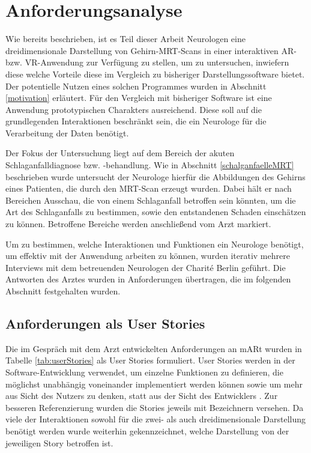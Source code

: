 
\chapter{Anforderungsanalyse}
\label{anforderung}

Wie bereits beschrieben, ist es Teil dieser Arbeit Neurologen eine dreidimensionale Darstellung von Gehirn-MRT-Scans in einer interaktiven AR- bzw. VR-Anwendung zur Verfügung zu stellen, um zu untersuchen, inwiefern diese welche Vorteile diese im Vergleich zu bisheriger Darstellungssoftware bietet.
Der potentielle Nutzen eines solchen Programmes wurden in Abschnitt \ref{motivation} erläutert.
Für den Vergleich mit bisheriger Software ist eine Anwendung prototypischen Charakters ausreichend. Diese soll auf die grundlegenden Interaktionen beschränkt sein, die ein Neurologe für die Verarbeitung der Daten benötigt.

Der Fokus der Untersuchung liegt auf dem Bereich der akuten Schlaganfalldiagnose bzw. -behandlung. Wie in Abschnitt \ref{schalganfaelleMRT} beschrieben wurde untersucht der Neurologe hierfür die Abbildungen des Gehirns eines Patienten, die durch den MRT-Scan erzeugt wurden. Dabei hält er nach Bereichen Ausschau, die von einem Schlaganfall betroffen sein könnten, um die Art des Schlaganfalls zu bestimmen, sowie den entstandenen Schaden einschätzen zu können. Betroffene Bereiche werden anschließend vom Arzt markiert. 

Um zu bestimmen, welche Interaktionen und Funktionen ein Neurologe benötigt, um effektiv mit der Anwendung arbeiten zu können, wurden iterativ mehrere Interviews mit dem betreuenden Neurologen der Charité Berlin geführt. Die Antworten des Arztes wurden in Anforderungen übertragen, die im folgenden Abschnitt festgehalten wurden. 

\section{Anforderungen als User Stories}

Die im Gespräch mit dem Arzt entwickelten Anforderungen an mARt wurden in Tabelle \ref{tab:userStories} als User Stories formuliert.
User Stories werden in der Software-Entwicklung verwendet, um einzelne Funktionen zu definieren, die möglichst unabhängig voneinander implementiert werden können sowie um mehr aus Sicht des Nutzers zu denken, statt aus der Sicht des Entwicklers \cite{UserStoriesApplied}.
Zur besseren Referenzierung wurden die Stories jeweils mit Bezeichnern versehen. Da viele der Interaktionen sowohl für die zwei- als auch dreidimensionale Darstellung benötigt werden wurde weiterhin gekennzeichnet, welche Darstellung von der jeweiligen Story betroffen ist.

